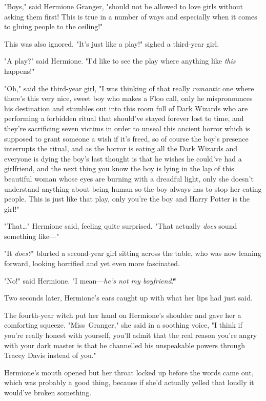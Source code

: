 "Boys," said Hermione Granger, "should not be allowed to love girls without
asking them first! This is true in a number of ways and especially when it
comes to gluing people to the ceiling!"

This was also ignored. "It's just like a play!" sighed a third-year girl.

"A play?" said Hermione. "I'd like to see the play where anything like
\emph{this} happens!"

"Oh," said the third-year girl, "I was thinking of that really \emph{romantic}
one where there's this very nice, sweet boy who makes a Floo call, only he
mispronounces his destination and stumbles out into this room full of Dark
Wizards who are performing a forbidden ritual that should've stayed forever
lost to time, and they're sacrificing seven victims in order to unseal this
ancient horror which is supposed to grant someone a wish if it's freed, so of
course the boy's presence interrupts the ritual, and as the horror is eating
all the Dark Wizards and everyone is dying the boy's last thought is that he
wishes he could've had a girlfriend, and the next thing you know the boy is
lying in the lap of this beautiful woman whose eyes are burning with a dreadful
light, only she doesn't understand anything about being human so the boy always
has to stop her eating people. This is just like that play, only you're the boy
and Harry Potter is the girl!"

"That…" Hermione said, feeling quite surprised. "That actually
\emph{does} sound something like—"

"It \emph{does?}" blurted a second-year girl sitting across the table, who was
now leaning forward, looking horrified and yet even more fascinated.

"No!" said Hermione. "I mean—\emph{he's not my boyfriend!}"

Two seconds later, Hermione's ears caught up with what her lips had just said.

The fourth-year witch put her hand on Hermione's shoulder and gave her a
comforting squeeze. "Miss~Granger," she said in a soothing voice, "I think if
you're really honest with yourself, you'll admit that the real reason you're
angry with your dark master is that he channelled his unspeakable powers through
Tracey Davis instead of you."

Hermione's mouth opened but her throat locked up before the words came out,
which was probably a good thing, because if she'd actually yelled that loudly
it would've broken something.

